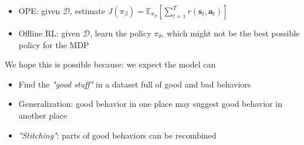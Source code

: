 \begin{itemize}
	\item \ac{OPE}: given $\mathcal{D}$, estimate $\displaystyle J(\pi_\beta) = \mathbb{E}_{\pi_\beta} \left[ \sum_{t=1}^T r(\textbf{s}_t, \textbf{a}_t) \right]$
	\item Offline \ac{RL}: given $\mathcal{D}$, learn the  policy $\pi_{\theta}$, which might not be the best possible policy for the \ac{MDP}
\end{itemize}

We hope this is possible because: we expect the model can
\begin{itemize}
	\item Find the \textit{"good stuff"} in a dataset full of good and bad behaviors
	\item Generalization: good behavior in one place may suggest good behavior in another place
	\item \textit{"Stitching"}: parts of good behaviors can be recombined \cite{singh2020cog}
\end{itemize}

